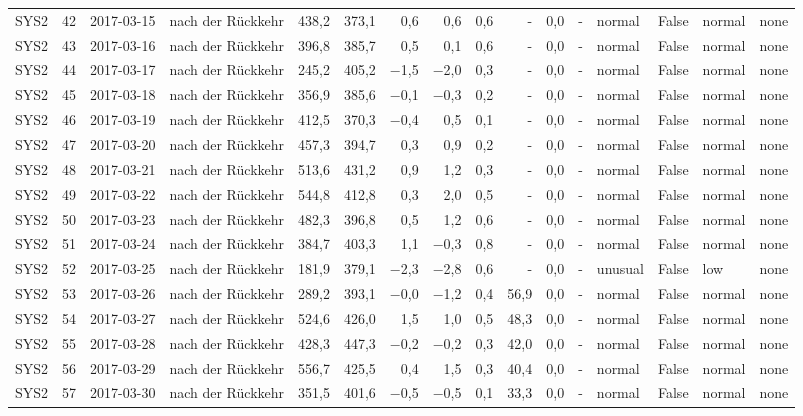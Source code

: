 \begin{tabular}{lrllrrrrrrrrlrll}
SYS2 & 42 & 2017-03-15 & nach der Rückkehr & 438,2 & 373,1 & 0,6 & 0,6 & 0,6 & - & 0,0 & - & normal & False & normal & none \\
SYS2 & 43 & 2017-03-16 & nach der Rückkehr & 396,8 & 385,7 & 0,5 & 0,1 & 0,6 & - & 0,0 & - & normal & False & normal & none \\
SYS2 & 44 & 2017-03-17 & nach der Rückkehr & 245,2 & 405,2 & $-$1,5 & $-$2,0 & 0,3 & - & 0,0 & - & normal & False & normal & none \\
SYS2 & 45 & 2017-03-18 & nach der Rückkehr & 356,9 & 385,6 & $-$0,1 & $-$0,3 & 0,2 & - & 0,0 & - & normal & False & normal & none \\
SYS2 & 46 & 2017-03-19 & nach der Rückkehr & 412,5 & 370,3 & $-$0,4 & 0,5 & 0,1 & - & 0,0 & - & normal & False & normal & none \\
SYS2 & 47 & 2017-03-20 & nach der Rückkehr & 457,3 & 394,7 & 0,3 & 0,9 & 0,2 & - & 0,0 & - & normal & False & normal & none \\
SYS2 & 48 & 2017-03-21 & nach der Rückkehr & 513,6 & 431,2 & 0,9 & 1,2 & 0,3 & - & 0,0 & - & normal & False & normal & none \\
SYS2 & 49 & 2017-03-22 & nach der Rückkehr & 544,8 & 412,8 & 0,3 & 2,0 & 0,5 & - & 0,0 & - & normal & False & normal & none \\
SYS2 & 50 & 2017-03-23 & nach der Rückkehr & 482,3 & 396,8 & 0,5 & 1,2 & 0,6 & - & 0,0 & - & normal & False & normal & none \\
SYS2 & 51 & 2017-03-24 & nach der Rückkehr & 384,7 & 403,3 & 1,1 & $-$0,3 & 0,8 & - & 0,0 & - & normal & False & normal & none \\
SYS2 & 52 & 2017-03-25 & nach der Rückkehr & 181,9 & 379,1 & $-$2,3 & $-$2,8 & 0,6 & - & 0,0 & - & unusual & False & low & none \\
SYS2 & 53 & 2017-03-26 & nach der Rückkehr & 289,2 & 393,1 & $-$0,0 & $-$1,2 & 0,4 & 56,9 & 0,0 & - & normal & False & normal & none \\
SYS2 & 54 & 2017-03-27 & nach der Rückkehr & 524,6 & 426,0 & 1,5 & 1,0 & 0,5 & 48,3 & 0,0 & - & normal & False & normal & none \\
SYS2 & 55 & 2017-03-28 & nach der Rückkehr & 428,3 & 447,3 & $-$0,2 & $-$0,2 & 0,3 & 42,0 & 0,0 & - & normal & False & normal & none \\
SYS2 & 56 & 2017-03-29 & nach der Rückkehr & 556,7 & 425,5 & 0,4 & 1,5 & 0,3 & 40,4 & 0,0 & - & normal & False & normal & none \\
SYS2 & 57 & 2017-03-30 & nach der Rückkehr & 351,5 & 401,6 & $-$0,5 & $-$0,5 & 0,1 & 33,3 & 0,0 & - & normal & False & normal & none \\

\end{tabular}
